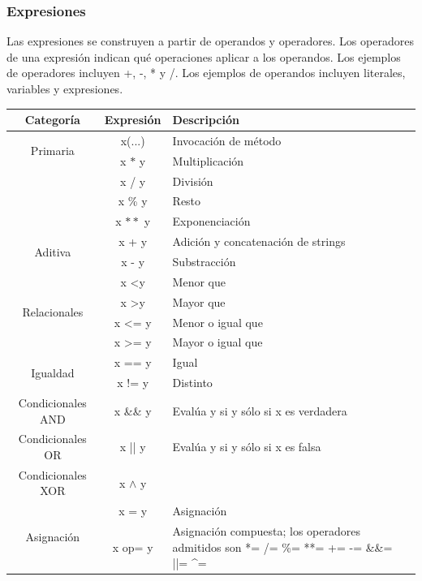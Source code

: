 \documentclass[12pt, letterpaper,spanish]{article}
\theoremstyle{definition}
\theoremstyle{remark}
\begin{document}
	\subsubsection{Expresiones}
	Las expresiones se construyen a partir de operandos y operadores. Los operadores de una expresión indican qué operaciones aplicar a los operandos. Los ejemplos de operadores incluyen +, -, * y /. Los ejemplos de operandos incluyen literales, variables y expresiones.\par
	\begin{center}
		\begin{tabular}{| c | c | m{5cm} | }
			\hline
			Categoría & Expresión & Descripción \\ \hline
			\multirow{2}{*}{Primaria} & x(...) & Invocación de método \\ \cline{2-3}		
			\multirow{4}{*}{Multiplicativa} & x $\ast$ y & Multiplicación \\ \cline{2-3}
			& x / y & División \\ \cline{2-3}
			& x \% y & Resto \\ \cline{2-3} 
			& x $\ast\ast$ y & Exponenciación \\ \hline
			\multirow{2}{*}{Aditiva} & x + y & Adición y concatenación de strings \\ \cline{2-3}
			& x - y & Substracción \\ \hline
			\multirow{4}{*}{Relacionales} & x <\;y & Menor que \\ \cline{2-3} 
			& x >\;y & Mayor que \\ \cline{2-3}
			& x <= y & Menor o igual que \\ \cline{2-3} 
			& x >= y & Mayor o igual que \\ \hline
			\multirow{2}{*}{Igualdad} & x == y & Igual \\ \cline{2-3} 
			& x != y & Distinto \\ \hline 
			Condicionales AND & x \&\& y & Evalúa y si y sólo si x es verdadera \\ \hline
			Condicionales OR & x || y & Evalúa y si y sólo si x es falsa \\ \hline
			Condicionales XOR & x $\wedge$ y & \\ \hline
			\multirow{2}{*}{Asignación} & x = y & Asignación \\ \cline{2-3}
			& x op= y & Asignación compuesta; los operadores admitidos son *= /= \%= **= += -= \&\&= ||= \textasciicircum{}= \\ \hline
		\end{tabular}
	\end{center}
\end{document}
